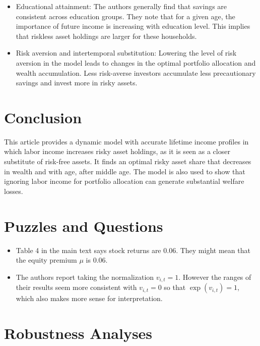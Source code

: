 \documentclass[./CGMPort.tex]{subfiles}
\begin{document}
\begin{itemize}
	\item Educational attainment: The authors generally find that savings are consistent across education groups. They note that for a given age, the importance of future income is increasing with education level. This implies that riskless asset holdings are larger for these households.
	\item Risk aversion and intertemporal substitution: Lowering the level of risk aversion in the model leads to changes in the optimal portfolio allocation and wealth accumulation. Less risk-averse investors accumulate less precautionary savings and invest more in risky assets.
\end{itemize}

\hypertarget{Conclusion}{}
\section{Conclusion}

This article provides a dynamic model with accurate lifetime income profiles in which labor income increases risky asset holdings, as it is seen as a closer substitute of risk-free assets. It finds an optimal risky asset share that decreases in wealth and with age, after middle age. The model is also used to show that ignoring labor income for portfolio allocation can generate substantial welfare losses.

\hypertarget{Puzzles-and-Questions}{}
\section{Puzzles and Questions}\label{sec:Puzzles}
\begin{itemize}
	\item Table 4 in the main text says stock returns are $0.06$. They might 
	mean that the equity premium $\mu$ is $0.06$.
	\item The authors report taking the normalization $v_{i,t} = 1$. However the ranges of their results seem more consistent with $v_{i,t} = 0$ so that $\exp (v_{i,t}) = 1$, which also makes more sense for interpretation.
\end{itemize}

\hypertarget{Robustness Analyses}{}
\section{Robustness Analyses}
\end{document}

